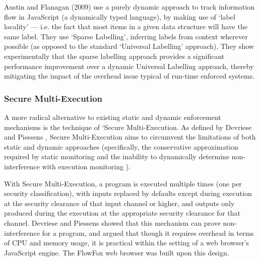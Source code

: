 Austin and Flanagan (2009) \cite{austin2009dynamicif} use a purely dynamic approach to track information flow in JavaScript (a dynamically typed language), by making use of `label locality' --- i.e. the fact that most items in a given data structure will have the same label. They use `Sparse Labelling', inferring labels from context wherever possible (as opposed to the standard `Universal Labelling' approach). They show experimentally that the sparse labelling approach provides a significant performance improvement over a dynamic Universal Labelling approach, thereby mitigating the impact of the overhead issue typical of run-time enforced systems.

\subsubsection{Secure Multi-Execution}

A more radical alternative to existing static and dynamic enforcement mechanisms is the technique of `Secure Multi-Execution. As defined by Devriese and Piessens \cite{devriese2010sme}, Secure Multi-Execution aims to circumvent the limitations of both static and dynamic approaches (specifically, the conservative approximation required by static monitoring and the inability to dynamically determine non-interference with execution monitoring \cite{schneider2000executionmonitoring}).

With Secure Multi-Execution, a program is executed multiple times (one per security classification), with inputs replaced by defaults except during execution at the security clearance of that input channel or higher, and outputs only produced during the execution at the appropriate security clearance for that channel. Devriese and Piessens \cite{devriese2010sme} showed that this mechanism can prove non-interference for a program, and argued that though it requires overhead in terms of CPU and memory usage, it is practical within the setting of a web browser's JavaScript engine. The FlowFox web browser \cite{degroef2012flowfox} was built upon this design.
	